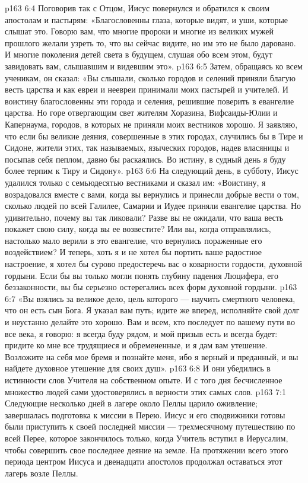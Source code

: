 \vs p163 6:4 Поговорив так с Отцом, Иисус повернулся и обратился к своим апостолам и пастырям: «Благословенны глаза, которые видят, и уши, которые слышат это. Говорю вам, что многие пророки и многие из великих мужей прошлого желали узреть то, что вы сейчас видите, но им это не было даровано. И многие поколения детей света в будущем, слушая обо всем этом, будут завидовать вам, слышавшим и видевшим это».
\vs p163 6:5 Затем, обращаясь ко всем ученикам, он сказал: «Вы слышали, сколько городов и селений приняли благую весть царства и как евреи и неевреи принимали моих пастырей и учителей. И воистину благословенны эти города и селения, решившие поверить в евангелие царства. Но горе отвергающим свет жителям Хоразина, Вифсаиды\hyp{}Юлии и Капернаума, городов, в которых не приняли моих вестников хорошо. Я заявляю, что если бы великие деяния, совершенные в этих городах, случились бы в Тире и Сидоне, жители этих, так называемых, языческих городов, надев власяницы и посыпав себя пеплом, давно бы раскаялись. Во истину, в судный день я буду более терпим к Тиру и Сидону».
\vs p163 6:6 \pc На следующий день, в субботу, Иисус удалился только с семьюдесятью вестниками и сказал им: «Воистину, я возрадовался вместе с вами, когда вы вернулись и принесли добрые вести о том, сколько людей по всей Галилее, Самарии и Иудее приняли евангелие царства. Но удивительно, почему вы так ликовали? Разве вы не ожидали, что ваша весть покажет свою силу, когда вы ее возвестите? Или вы, когда отправлялись, настолько мало верили в это евангелие, что вернулись пораженные его воздействием? И теперь, хоть я и не хотел бы портить ваше радостное настроение, я хотел бы сурово предостеречь вас о коварности гордости, духовной гордыни. Если бы вы только могли понять глубину падения Люцифера, его беззаконности, вы бы серьезно остерегались всех форм духовной гордыни.
\vs p163 6:7 «Вы взялись за великое дело, цель которого --- научить смертного человека, что он есть сын Бога. Я указал вам путь; идите же вперед, исполняйте свой долг и неустанно делайте это хорошо. Вам и всем, кто последует по вашему пути во все века, я говорю: я всегда буду рядом, и мой призыв есть и всегда будет: придите ко мне все трудящиеся и обремененные, и я дам вам утешение. Возложите на себя мое бремя и познайте меня, ибо я верный и преданный, и вы найдете духовное утешение для своих душ».
\vs p163 6:8 \pc И они убедились в истинности слов Учителя на собственном опыте. И с того дня бесчисленное множество людей сами удостоверялись в верности этих самых слов.
\vs p163 7:1 Следующие несколько дней в лагере около Пеллы царило оживление; завершалась подготовка к миссии в Перею. Иисус и его сподвижники готовы были приступить к своей последней миссии --- трехмесячному путешествию по всей Перее, которое закончилось только, когда Учитель вступил в Иерусалим, чтобы совершить свое последнее деяние на земле. На протяжении всего этого периода центром Иисуса и двенадцати апостолов продолжал оставаться этот лагерь возле Пеллы.
